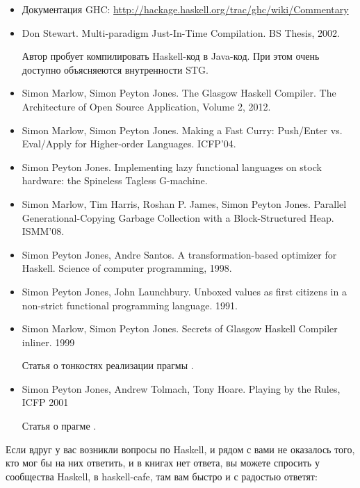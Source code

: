 \begin{itemize}
\item Документация GHC:
\url{http://hackage.haskell.org/trac/ghc/wiki/Commentary}

\item Don Stewart. Multi-paradigm Just-In-Time Compilation. BS Thesis, 2002.

    Автор пробует компилировать Haskell-код в Java-код. При этом
    очень доступно объясняеются внутренности STG. 

\item Simon Marlow, Simon Peyton Jones. The Glasgow Haskell Compiler. 
    The Architecture of Open Source Application, Volume 2, 2012.

\item Simon Marlow, Simon Peyton Jones. Making a Fast Curry: Push/Enter vs.
    Eval/Apply for Higher-order Languages. ICFP'04.

\item Simon Peyton Jones. Implementing lazy functional languages
on stock hardware: the Spineless Tagless G-machine.

\item Simon Marlow, Tim Harris, Roshan P. James, Simon Peyton Jones.
    Parallel Generational-Copying Garbage Collection with a 
    Block-Structured Heap. ISMM'08.

\item Simon Peyton Jones, Andre Santos. 
    A transformation-based optimizer for Haskell.
    Science of computer programming, 1998.

\item Simon Peyton Jones, John Launchbury. 
    Unboxed values as first citizens in a non-strict 
    functional programming language. 1991.

\item Simon Marlow, Simon Peyton Jones. 
    Secrets of Glasgow Haskell Compiler inliner. 1999

    Статья о тонкостях реализации прагмы .

\item Simon Peyton Jones, Andrew Tolmach, Tony Hoare.
    Playing by the Rules, ICFP 2001

    Статья о прагме .
\end{itemize}



Если вдруг у вас возникли вопросы по Haskell, и рядом с вами не оказалось
того, кто мог бы на них ответить, и в книгах нет ответа, вы 
можете спросить у сообщества Haskell,
в haskell-cafe, там вам быстро и с радостью ответят:

